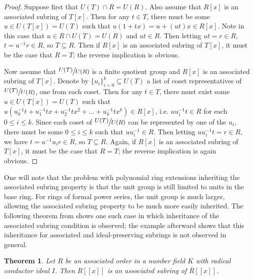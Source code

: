 \documentclass[12pt]{amsart}
\newtheorem{theorem}{Theorem}[section]
\theoremstyle{definition}
\newcommand{\Rbar}{\overline{R}}
\newcommand{\quot}[2]{\large\sfrac{#1}{#2}\normalsize}
\begin{document}
	\begin{proof}
		Suppose first that $U(T)\cap R=U(R)$. Also assume that $R[x]$ is an associated subring of $T[x]$. Then for any $t\in T$, there must be some $u\in U(T[x])=U(T)$ such that $u(1+tx)=u+(ut)x\in R[x]$. Note in this case that $u\in R\cap U(T)=U(R)$ and $ut\in R$. Then letting $ut=r\in R$, $t=u^{-1}r\in R$, so $T\subseteq R$. Then if $R[x]$ is an associated subring of $T[x]$, it must be the case that $R=T$; the reverse implication is obvious.
		
		Now assume that $\quot{U(T)}{U(R)}$ is a finite quotient group and $R[x]$ is an associated subring of $T[x]$. Denote by $\{u_i\}_{i=0}^k\subseteq U(T)$ a list of coset representatives of $\quot{U(T)}{U(R)}$, one from each coset. Then for any $t\in T$, there must exist some $u\in U(T[x])=U(T)$ such that $u(u_0^{-1}t+u_1^{-1}tx+u_2^{-1}tx^2+\dots+u_k^{-1}tx^k)\in R[x]$, i.e. $uu_i^{-1}t\in R$ for each $0\leq i\leq k$. Since each coset of $\quot{U(T)}{U(R)}$ can be represented by one of the $u_i$, there must be some $0\leq i\leq k$ such that $uu_i^{-1}\in R$. Then letting $uu_i^{-1}t=r\in R$, we have $t=u^{-1}u_ir\in R$, so $T\subseteq R$. Again, if $R[x]$ is an associated subring of $T[x]$, it must be the case that $R=T$; the reverse implication is again obvious.
	\end{proof}
	
	One will note that the problem with polynomial ring extensions inheriting the associated subring property is that the unit group is still limited to units in the base ring. For rings of formal power series, the unit group is much larger, allowing the associated subring property to be much more easily inherited. The following theorem from \cite{radicalconductor} shows one such case in which inheritance of the associated subring condition is observed; the example afterward shows that this inheritance for associated and ideal-preserving subrings is not observed in general.
	
	\begin{theorem}
		Let $R$ be an associated order in a number field $K$ with radical conductor ideal $I$. Then $R[[x]]$ is an associated subring of $\Rbar[[x]]$.
	\end{theorem}
	
\end{document}
